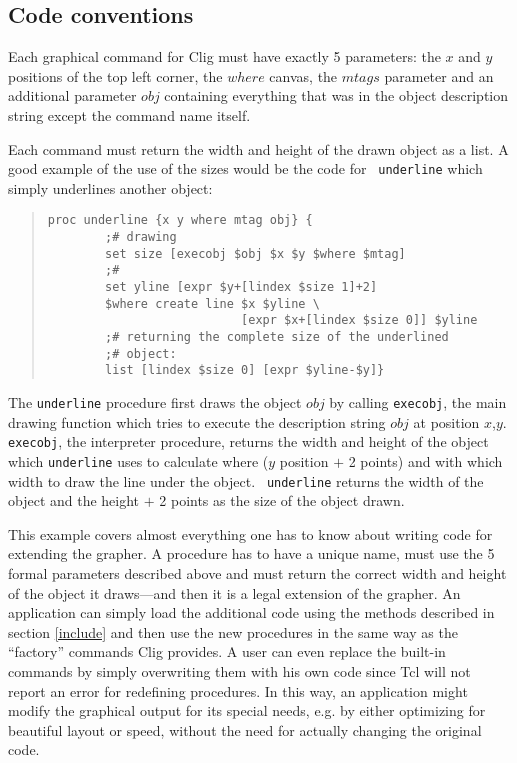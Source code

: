 \subsection{Code conventions}
\label{code}

Each graphical command for {\sc Clig} must have exactly 5 parameters:
the $x$ and $y$ positions of the top left corner, the $where$ canvas,
the $mtags$ parameter and an additional parameter $obj$ containing
everything that was in the object description string except the command
name itself.

Each command must return the width and height of the drawn object as a
list. A good example of the use of the sizes would be the code for {\tt
underline} which simply underlines another object:

\begin{quote}
\begin{verbatim}
proc underline {x y where mtag obj} { 
        ;# drawing
        set size [execobj $obj $x $y $where $mtag]
        ;#
        set yline [expr $y+[lindex $size 1]+2]
        $where create line $x $yline \
                           [expr $x+[lindex $size 0]] $yline
        ;# returning the complete size of the underlined
        ;# object:
        list [lindex $size 0] [expr $yline-$y]}
\end{verbatim}
\end{quote}

The {\tt underline} procedure first draws the object $obj$ by calling
{\tt execobj}, the main drawing function which tries to execute the
description string $obj$ at position $x$,$y$. {\tt execobj}, the
interpreter procedure, returns the width and height of the object
which {\tt underline} uses to calculate where ($y$ position $+$ 2
points) and with which width to draw the line under the object. {\tt
underline} returns the width of the object and the height $+$ 2 points
as the size of the object drawn.

This example covers almost everything one has to know about writing
code for extending the grapher. A procedure has to have a unique name,
must use the 5 formal parameters described above and must return the
correct width and height of the object it draws---and then it is a
legal extension of the grapher. An application can simply load the
additional code using the methods described in section \ref{include}
and then use the new procedures in the same way as the ``factory''
commands {\sc Clig} provides. A user can even replace the built-in
commands by simply overwriting them with his own code since {\sc Tcl}
will not report an error for redefining procedures. In this way, an
application might modify the graphical output for its special needs,
e.g. by either optimizing for beautiful layout or speed, without the
need for actually changing the original code.

